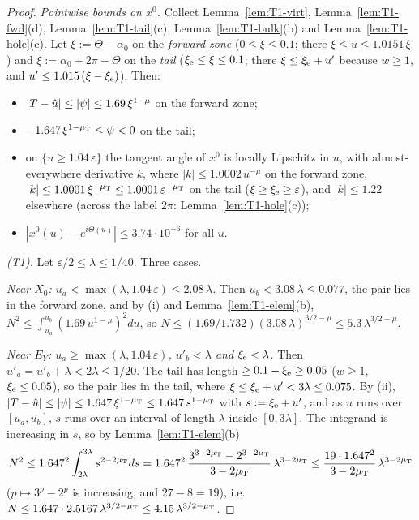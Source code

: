 \begin{proof}
\emph{Pointwise bounds on $x^0$.} Collect Lemma~\ref{lem:T1-virt}, Lemma~\ref{lem:T1-fwd}(d), Lemma~\ref{lem:T1-tail}(c),
Lemma~\ref{lem:T1-bulk}(b) and Lemma~\ref{lem:T1-hole}(c). Let $\xi:=\Theta-\alpha_0$ on the \emph{forward zone} ($0\le\xi\le0.1$; there
$\xi\le u\le1.0151\,\xi$) and $\xi:=\alpha_0+2\pi-\Theta$ on the \emph{tail} ($\xi_{\mathrm e}\le\xi\le0.1$; there $\xi\le\xi_{\mathrm e}+u'$ because
$w\ge1$, and $u'\le1.015\,(\xi-\xi_{\mathrm e})$). Then:
\begin{itemize}
\item[(i)] $|T-\hat u|\le|\psi|\le1.69\,\xi^{1-\mu}$ on the forward zone;
\item[(ii)] $-1.647\,\xi^{1-\mu_{\mathrm T}}\le\psi<0$ on the tail;
\item[(iii)] on $\{u\ge1.04\,\varepsilon\}$ the tangent angle of $x^0$ is locally Lipschitz in $u$, with almost-everywhere derivative
$k$, where $|k|\le1.0002\,u^{-\mu}$ on the forward zone, $|k|\le1.0001\,\xi^{-\mu_{\mathrm T}}\le1.0001\,\varepsilon^{-\mu_{\mathrm T}}$ on the tail
($\xi\ge\xi_{\mathrm e}\ge\varepsilon$), and $|k|\le1.22$ elsewhere (across the label $2\pi$: Lemma~\ref{lem:T1-hole}(c));
\item[(iv)] $|x^0(u)-e^{i\Theta(u)}|\le3.74\cdot10^{-6}$ for all $u$.
\end{itemize}

\emph{\textup{(T1)}.} Let $\varepsilon/2\le\lambda\le1/40$. Three cases.

\emph{Near $X_0$: $u_a<\max(\lambda,1.04\,\varepsilon)\le2.08\,\lambda$.} Then $u_b<3.08\,\lambda\le0.077$, the pair lies in the forward
zone, and by (i) and Lemma~\ref{lem:T1-elem}(b), $N^2\le\int_{u_a}^{u_b}(1.69\,u^{1-\mu})^2du$, so
$N\le(1.69/1.732)(3.08\,\lambda)^{3/2-\mu}\le5.3\,\lambda^{3/2-\mu}$.

\emph{Near $E_Y$: $u_a\ge\max(\lambda,1.04\,\varepsilon)$, $u'_b<\lambda$ and $\xi_{\mathrm e}<\lambda$.} Then $u'_a=u'_b+\lambda<2\lambda\le1/20$.
The tail has length $\ge0.1-\xi_{\mathrm e}\ge0.05$ ($w\ge1$, $\xi_{\mathrm e}\le0.05$), so the pair lies in the tail, where $\xi\le\xi_{\mathrm e}+u'<3\lambda\le0.075$.
By (ii), $|T-\hat u|\le|\psi|\le1.647\,\xi^{1-\mu_{\mathrm T}}\le1.647\,s^{1-\mu_{\mathrm T}}$ with $s:=\xi_{\mathrm e}+u'$, and as $u$ runs over $[u_a,u_b]$, $s$ runs
over an interval of length $\lambda$ inside $[0,3\lambda]$. The integrand is increasing in $s$, so by Lemma~\ref{lem:T1-elem}(b)
\[
N^2\le1.647^2\int_{2\lambda}^{3\lambda}s^{2-2\mu_{\mathrm T}}ds=1.647^2\,\frac{3^{3-2\mu_{\mathrm T}}-2^{3-2\mu_{\mathrm T}}}{3-2\mu_{\mathrm T}}\,\lambda^{3-2\mu_{\mathrm T}}
\le\frac{19\cdot1.647^2}{3-2\mu_{\mathrm T}}\,\lambda^{3-2\mu_{\mathrm T}}
\]
($p\mapsto3^p-2^p$ is increasing, and $27-8=19$), i.e.\ $N\le1.647\cdot2.5167\,\lambda^{3/2-\mu_{\mathrm T}}\le4.15\,\lambda^{3/2-\mu_{\mathrm T}}$.


\end{proof}

